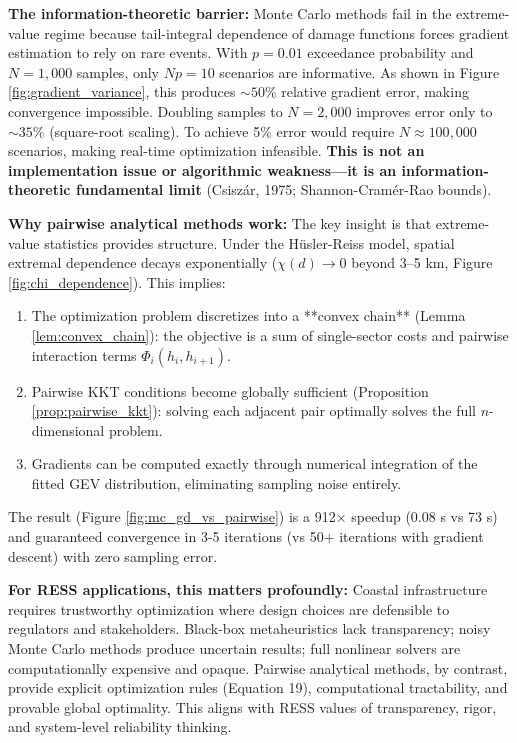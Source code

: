 \documentclass[review]{elsarticle}
\begin{document}
\textbf{The information-theoretic barrier:} Monte Carlo methods fail in the extreme-value regime because tail-integral dependence of damage functions forces gradient estimation to rely on rare events. With $p = 0.01$ exceedance probability and $N = 1,000$ samples, only $Np = 10$ scenarios are informative. As shown in Figure \ref{fig:gradient_variance}, this produces $\sim 50\%$ relative gradient error, making convergence impossible. Doubling samples to $N = 2,000$ improves error only to $\sim 35\%$ (square-root scaling). To achieve 5\% error would require $N \approx 100,000$ scenarios, making real-time optimization infeasible. \textbf{This is not an implementation issue or algorithmic weakness---it is an information-theoretic fundamental limit} (Csiszár, 1975; Shannon-Cramér-Rao bounds).

\textbf{Why pairwise analytical methods work:} The key insight is that extreme-value statistics provides structure. Under the Hüsler-Reiss model, spatial extremal dependence decays exponentially ($\chi(d) \to 0$ beyond 3--5 km, Figure \ref{fig:chi_dependence}). This implies:
\begin{enumerate}
\item The optimization problem discretizes into a **convex chain** (Lemma \ref{lem:convex_chain}): the objective is a sum of single-sector costs and pairwise interaction terms $\Phi_i(h_i, h_{i+1})$.
\item Pairwise KKT conditions become globally sufficient (Proposition \ref{prop:pairwise_kkt}): solving each adjacent pair optimally solves the full $n$-dimensional problem.
\item Gradients can be computed exactly through numerical integration of the fitted GEV distribution, eliminating sampling noise entirely.
\end{enumerate}

The result (Figure \ref{fig:mc_gd_vs_pairwise}) is a 912× speedup (0.08 s vs 73 s) and guaranteed convergence in 3-5 iterations (vs 50+ iterations with gradient descent) with zero sampling error.

\textbf{For RESS applications, this matters profoundly:} Coastal infrastructure requires trustworthy optimization where design choices are defensible to regulators and stakeholders. Black-box metaheuristics lack transparency; noisy Monte Carlo methods produce uncertain results; full nonlinear solvers are computationally expensive and opaque. Pairwise analytical methods, by contrast, provide explicit optimization rules (Equation 19), computational tractability, and provable global optimality. This aligns with RESS values of transparency, rigor, and system-level reliability thinking.
\end{document}
